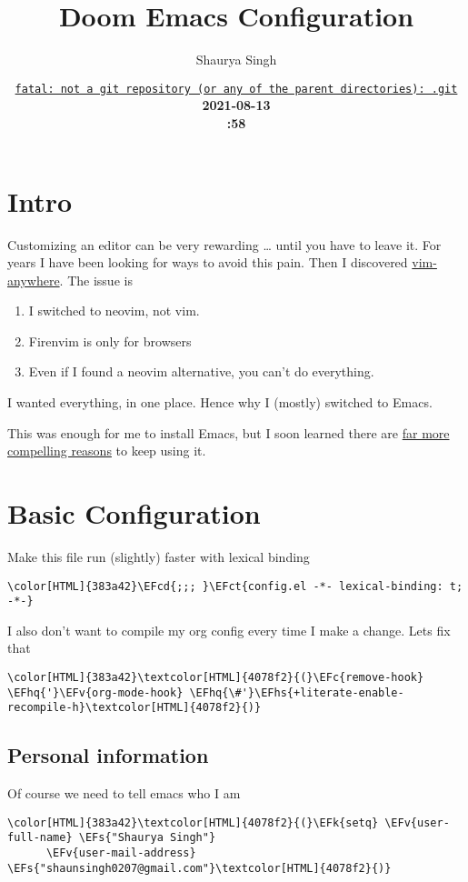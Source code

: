 \documentclass{scrartcl}
\author{Shaurya Singh}
\date{\href{https://github.com/shaunsingh/vimrc-dotfiles/commit/fatal: not a git repository (or any of the parent directories): .git}{\normalsize\texttt{fatal: not a git repository (or any of the parent directories): .git}}\\\Large\bfseries 2021-08-13 \\\normalsize\mdseries22:58 \acr{\lowercase{UTC}}\iffalse, \href{https://github.com/shaunsingh/vimrc-dotfiles/commit/fatal: not a git repository (or any of the parent directories): .git}{\normalsize\texttt{fatal: not a git repository (or any of the parent directories): .git}}\fi}
\title{Doom Emacs Configuration}
\newcommand{\EFk}[1]{\textcolor{EFk}{#1}} %
\newcommand{\EFs}[1]{\textcolor{EFs}{#1}} %
\newcommand{\EFct}[1]{\textcolor{EFct}{#1}} %
\newcommand{\EFc}[1]{\textcolor{EFc}{#1}} %
\newcommand{\EFv}[1]{\textcolor{EFv}{#1}} %
\newcommand{\EFcd}[1]{\textcolor{EFcd}{#1}} %
\newcommand{\EFhq}[1]{\textcolor{EFhq}{#1}} %
\newcommand{\EFhs}[1]{\textcolor{EFhs}{#1}} %
\begin{document}
\maketitle
\tableofcontents


\section{Intro}
\label{sec:org056ec38}
Customizing an editor can be very rewarding \ldots{} until you have to leave it.
For years I have been looking for ways to avoid this pain.
Then I discovered \href{https://github.com/cknadler/vim-anywhere}{vim-anywhere}. The issue is

\begin{enumerate}
\item I switched to neovim, not vim.
\item Firenvim is only for browsers
\item Even if I found a neovim alternative, you can't do everything.
\end{enumerate}

I wanted everything, in one place. Hence why I (mostly) switched to Emacs.

This was enough for me to install Emacs, but I soon learned there are \href{https://github.com/remacs/remacs\#why-emacs}{far more
compelling reasons} to keep using it.

\section{Basic Configuration}
\label{sec:org6969435}
Make this file run (slightly) faster with lexical binding
\begin{Code}
\begin{Verbatim}[]
\color[HTML]{383a42}\EFcd{;;; }\EFct{config.el -*- lexical-binding: t; -*-}
\end{Verbatim}
\end{Code}

I also don't want to compile my org config every time I make a change. Lets fix that
\begin{Code}
\begin{Verbatim}[]
\color[HTML]{383a42}\textcolor[HTML]{4078f2}{(}\EFc{remove-hook} \EFhq{'}\EFv{org-mode-hook} \EFhq{\#'}\EFhs{+literate-enable-recompile-h}\textcolor[HTML]{4078f2}{)}
\end{Verbatim}
\end{Code}

\subsection{Personal information}
\label{sec:org914aaf6}
Of course we need to tell emacs who I am
\begin{Code}
\begin{Verbatim}[]
\color[HTML]{383a42}\textcolor[HTML]{4078f2}{(}\EFk{setq} \EFv{user-full-name} \EFs{"Shaurya Singh"}
      \EFv{user-mail-address} \EFs{"shaunsingh0207@gmail.com"}\textcolor[HTML]{4078f2}{)}
\end{Verbatim}
\end{Code}
\end{document}
